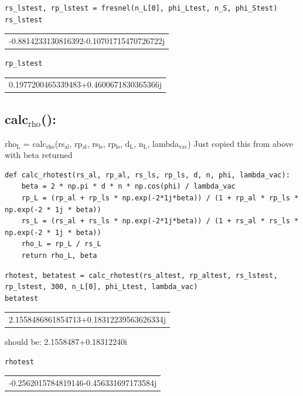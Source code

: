\documentclass[11pt]{article}
\begin{document}
\begin{verbatim}
rs_lstest, rp_lstest = fresnel(n_L[0], phi_Ltest, n_S, phi_Stest)
rs_lstest
\end{verbatim}

\begin{center}
\begin{tabular}{l}
-0.8814233130816392-0.10701715470726722j\\
\end{tabular}
\end{center}

\begin{verbatim}
rp_lstest
\end{verbatim}

\begin{center}
\begin{tabular}{l}
0.1977200465339483+0.4600671830365366j\\
\end{tabular}
\end{center}

\subsection{calc\(_{\text{rho}}\)():}
\label{sec:orgfddc69f}

rho\(_{\text{L}}\) = calc\(_{\text{rho}}\)(rs\(_{\text{al}}\), rp\(_{\text{al}}\), rs\(_{\text{ls}}\), rp\(_{\text{ls}}\), d\(_{\text{L}}\), n\(_{\text{L}}\), lambda\(_{\text{vac}}\))
 Just copied this from above with beta returned 
\begin{verbatim}
def calc_rhotest(rs_al, rp_al, rs_ls, rp_ls, d, n, phi, lambda_vac):
    beta = 2 * np.pi * d * n * np.cos(phi) / lambda_vac
    rp_L = (rp_al + rp_ls * np.exp(-2*1j*beta)) / (1 + rp_al * rp_ls * np.exp(-2 * 1j * beta))
    rs_L = (rs_al + rs_ls * np.exp(-2*1j*beta)) / (1 + rs_al * rs_ls * np.exp(-2 * 1j * beta))
    rho_L = rp_L / rs_L
    return rho_L, beta
\end{verbatim}

\begin{verbatim}
rhotest, betatest = calc_rhotest(rs_altest, rp_altest, rs_lstest, rp_lstest, 300, n_L[0], phi_Ltest, lambda_vac)
betatest
\end{verbatim}

\begin{center}
\begin{tabular}{l}
2.1558486861854713+0.18312239563626334j\\
\end{tabular}
\end{center}
should be: 2.1558487+0.18312240i

\begin{verbatim}
rhotest 
\end{verbatim}

\begin{center}
\begin{tabular}{l}
-0.2562015784819146-0.456331697173584j\\
\end{tabular}
\end{center}

\section{}
\label{sec:orgd9ba7fd}
\end{document}

